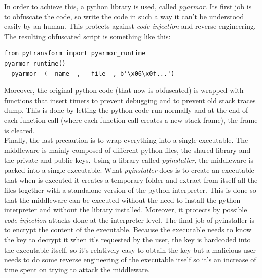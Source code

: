 In order to achieve this, a python library is used, called \textit{pyarmor}. Its first job is to obfuscate the code, so write the code in such a way it can't be understood easily by an human. This protects against \textit{code injection} and reverse engineering. The resulting obfuscated script is something like this:

\begin{lstlisting}[style=PyStyle]
from pytransform import pyarmor_runtime
pyarmor_runtime()
__pyarmor__(__name__, __file__, b'\x06\x0f...')
\end{lstlisting}

Moreover, the original python code (that now is obfuscated) is wrapped with functions that insert timers to prevent debugging and to prevent old stack traces dump. This is done by letting the python code run normally and at the end of each function call (where each function call creates a new stack frame), the frame is cleared. \\

Finally, the last precaution is to wrap everything into a single executable. The middleware is mainly composed of different python files, the shared library and the private and public keys. Using a library called \textit{pyinstaller}, the middleware is packed into a single executable. What \textit{pyinstaller} does is to create an executable that when is executed it creates a temporary folder and extract from itself all the files together with a standalone version of the python interpreter. This is done so that the middleware can be executed without the need to install the python interpreter and without the library installed. Moreover, it protects by possible \textit{code injection} attacks done at the interpreter level. The final job of pyinstaller is to encrypt the content of the executable. Because the executable needs to know the key to decrypt it when it's requested by the user, the key is hardcoded into the executable itself, so it's relatively easy to obtain the key but a malicious user needs to do some reverse engineering of the executable itself so it's an increase of time spent on trying to attack the middleware. 



